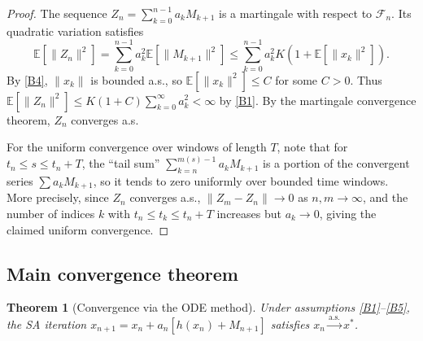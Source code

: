 \documentclass[11pt,a4paper]{article}
\theoremstyle{definition}
\theoremstyle{plain}
\newtheorem{theorem}{Theorem}[section]
\theoremstyle{remark}
\newcommand{\E}{\mathbb{E}}
\newcommand{\cas}{\xrightarrow{\text{a.s.}}}
\begin{document}
\begin{proof}
The sequence $Z_n = \sum_{k=0}^{n-1} a_k M_{k+1}$ is a martingale with respect to
$\mathcal{F}_n$. Its quadratic variation satisfies
\[
  \E[\|Z_n\|^2] = \sum_{k=0}^{n-1} a_k^2 \E[\|M_{k+1}\|^2]
    \leq \sum_{k=0}^{n-1} a_k^2 K(1 + \E[\|x_k\|^2]).
\]
By \ref{B4}, $\|x_k\|$ is bounded a.s., so $\E[\|x_k\|^2] \leq C$ for some $C > 0$.
Thus $\E[\|Z_n\|^2] \leq K(1 + C) \sum_{k=0}^{\infty} a_k^2 < \infty$ by \ref{B1}.
By the martingale convergence theorem, $Z_n$ converges a.s.

For the uniform convergence over windows of length $T$, note that for
$t_n \leq s \leq t_n + T$, the ``tail sum'' $\sum_{k=n}^{m(s)-1} a_k M_{k+1}$
is a portion of the convergent series $\sum a_k M_{k+1}$, so it tends to zero
uniformly over bounded time windows. More precisely, since $Z_n$ converges a.s.,
$\|Z_m - Z_n\| \to 0$ as $n, m \to \infty$, and the number of indices $k$ with
$t_n \leq t_k \leq t_n + T$ increases but $a_k \to 0$, giving the claimed uniform
convergence.
\end{proof}

\subsection{Main convergence theorem}

\begin{theorem}[Convergence via the ODE method]
\label{thm:ode-convergence}
Under assumptions \ref{B1}--\ref{B5}, the SA iteration
$x_{n+1} = x_n + a_n[h(x_n) + M_{n+1}]$ satisfies $x_n \cas x^*$.
\end{theorem}
\end{document}

